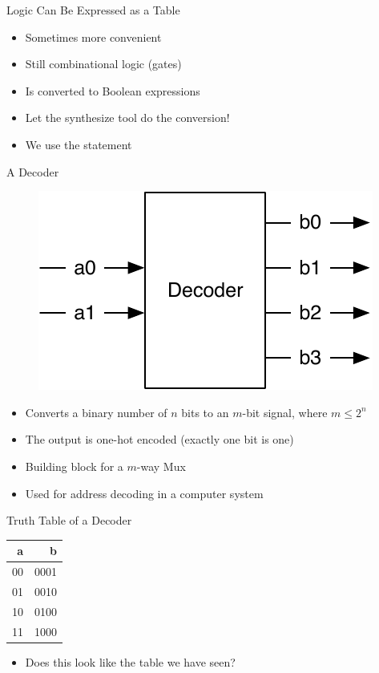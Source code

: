 \begin{frame}[fragile]{Logic Can Be Expressed as a Table}
\begin{itemize}
\item Sometimes more convenient 
\item Still combinational logic (gates)
\item Is converted to Boolean expressions
\item Let the synthesize tool do the conversion!
\item We use the  statement
\end{itemize}
\end{frame}


\begin{frame}[fragile]{A Decoder}
\begin{figure}
  \includegraphics[scale=\scale]{../figures/decoder}
\end{figure}
\begin{itemize}
\item Converts a binary number of $n$ bits to an $m$-bit signal, where $m \leq 2^n$
\item The output is one-hot encoded (exactly one bit is one)
\item Building block for a $m$-way Mux
\item Used for address decoding in a computer system
\end{itemize}
\end{frame}

\begin{frame}[fragile]{Truth Table of a Decoder}
\begin{table}
  \begin{tabular}{rr}
    \toprule
    a & b \\
    \midrule
    00 & 0001 \\
    01 & 0010 \\
    10 & 0100 \\
    11 & 1000 \\
    \bottomrule 
  \end{tabular} 
\end{table}
\begin{itemize}
\item Does this look like the table we have seen?
\end{itemize}
\end{frame}

